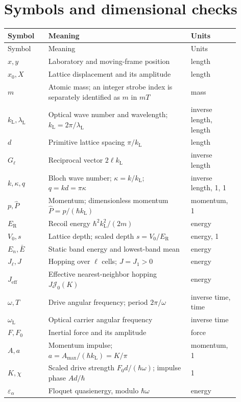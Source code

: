 \documentclass[11pt,oneside]{report}
\numberwithin{equation}{chapter}
\newcommand{\ER}{E_{\mathrm R}}
\newcommand{\Jeff}{J_{\mathrm{eff}}}
\begin{document}
\chapter{Symbols and dimensional checks}
{\small
\begin{longtable}{P{0.16\linewidth}P{0.56\linewidth}P{0.18\linewidth}}
\toprule Symbol&Meaning&Units\\\midrule\endfirsthead
\toprule Symbol&Meaning&Units\\\midrule\endhead
$x,y$&Laboratory and moving-frame position&length\\
$x_0,X$&Lattice displacement and its amplitude&length\\
$m$&Atomic mass; an integer strobe index is separately identified as $m$ in $mT$&mass\\
$k_{\mathrm L},\lambda_{\mathrm L}$&Optical wave number and wavelength; $k_{\mathrm L}=2\pi/\lambda_{\mathrm L}$&inverse length, length\\
$d$&Primitive lattice spacing $\pi/k_{\mathrm L}$&length\\
$G_\ell$&Reciprocal vector $2\ell k_{\mathrm L}$&inverse length\\
$k,\kappa,q$&Bloch wave number; $\kappa=k/k_{\mathrm L}$; $q=kd=\pi\kappa$&inverse length, 1, 1\\
$p,\hat P$&Momentum; dimensionless momentum $\hat P=p/(\hbar k_{\mathrm L})$&momentum, 1\\
$\ER$&Recoil energy $\hbar^2k_{\mathrm L}^2/(2m)$&energy\\
$V_0,s$&Lattice depth; scaled depth $s=V_0/\ER$&energy, 1\\
$E_n,\bar E$&Static band energy and lowest-band mean&energy\\
$J_\ell,J$&Hopping over $\ell$ cells; $J=J_1>0$&energy\\
$\Jeff$&Effective nearest-neighbor hopping $J\mathcal J_0(K)$&energy\\
$\omega,T$&Drive angular frequency; period $2\pi/\omega$&inverse time, time\\
$\omega_{\mathrm L}$&Optical carrier angular frequency&inverse time\\
$F,F_0$&Inertial force and its amplitude&force\\
$A,a$&Momentum impulse; $a=A_{\max}/(\hbar k_{\mathrm L})=K/\pi$&momentum, 1\\
$K,\chi$&Scaled drive strength $F_0d/(\hbar\omega)$; impulse phase $Ad/\hbar$&1\\
$\varepsilon_\alpha$&Floquet quasienergy, modulo $\hbar\omega$&energy\\

\end{longtable}}
\end{document}
